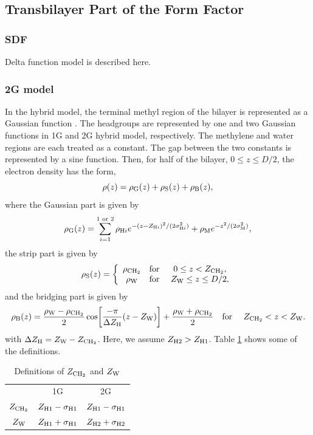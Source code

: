 \subsection{Transbilayer Part of the Form Factor}\label{sec:transbilayer}
\subsubsection{SDF}
Delta function model is described here.

\subsubsection{2G model}
In the hybrid model, the terminal methyl region of the bilayer is represented
as a Gaussian function \cite{ref:Wiener89}. The headgroups are represented by one 
and two Gaussian
functions in 1G and 2G hybrid model, respectively. The methylene and water 
regions are each treated as a constant. The gap between the two constants is 
represented by a sine function. Then, for half of the bilayer, 
$0 \leq z \leq D/2$, the electron density has the form, 
\begin{equation}
  \rho(z) = \rho_\mathrm{G}(z) + \rho_\mathrm{S}(z) + \rho_\mathrm{B}(z),
\end{equation}
where the Gaussian part is given by 
\begin{equation}
  \rho_\mathrm{G}(z) = \sum_{i=1}^{1\text{ or }2} \rho_{\mathrm{H}i}
             e^{-(z-Z_{\mathrm{H}i})^2/(2\sigma_{\mathrm{H}i}^2)} + \rho_\mathrm{M} e^{-z^2/(2\sigma_\mathrm{M}^2)},
\end{equation}
the strip part is given by
\begin{equation}
  \rho_\mathrm{S}(z) = \left\{
    \begin{array}{ccc}
      \rho_\mathrm{CH_2} & \text{for } & 0 \leq z < Z_\mathrm{CH_2}, \\
      \rho_\mathrm{W}   & \text{for } & Z_\mathrm{W} \leq z \leq D/2,
    \end{array}
  \right.
\end{equation}
and the bridging part is given by
\begin{equation}
  \rho_\mathrm{B}(z) = \frac{\rho_\mathrm{W}-\rho_\mathrm{CH_2}}{2} \cos \mathopen{}\left[ 
    \frac{-\pi}{\Delta Z_\mathrm{H}}(z-Z_\mathrm{W}) \right]\mathclose{} + \frac{\rho_\mathrm{W}+\rho_\mathrm{CH_2}}{2} \\
  \text{\quad for \quad} Z_\mathrm{CH_2} < z < Z_\mathrm{W}.
\end{equation}
with $\Delta Z_\mathrm{H}=Z_\mathrm{W}-Z_\mathrm{CH_2}$. Here, we assume $Z_{\mathrm{H}2}>Z_{\mathrm{H}1}$. 
Table \ref{tb:zchtwozw} shows some of the definitions.

\begin{table}[htb]
  \centering
  \begin{tabular}{c c c}
     & 1G & 2G \\
    $Z_\mathrm{CH_2}$ & $Z_{\mathrm{H}1}-\sigma_{\mathrm{H}1}$ & $Z_{\mathrm{H}1}-\sigma_{\mathrm{H}1}$ \\
    $Z_\mathrm{W}$ & $Z_{\mathrm{H}1}+\sigma_{\mathrm{H}1}$ & $Z_{\mathrm{H}2}+\sigma_{\mathrm{H}2}$   
  \end{tabular}
  \caption{Definitions of $Z_\mathrm{CH_2}$ and $Z_\mathrm{W}$}
  \label{tb:zchtwozw}
\end{table}

